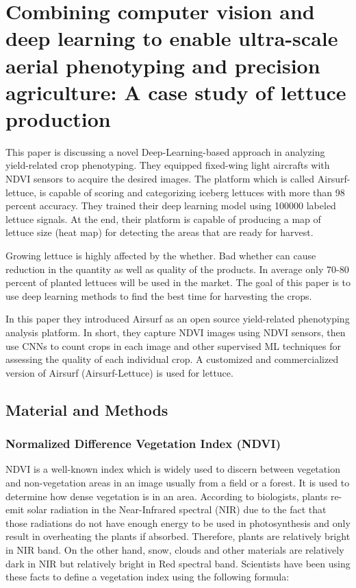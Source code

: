 \documentclass{article}
\begin{document}
\section{Combining computer vision and deep learning to enable ultra-scale aerial phenotyping and precision agriculture: A case study of lettuce production ~\cite{bauer-2019-combining-yield}}

This paper is discussing a novel Deep-Learning-based approach in analyzing yield-related crop phenotyping. They equipped fixed-wing light aircrafts with NDVI sensors to acquire the desired images. The platform which is called Airsurf-lettuce, is capable of scoring and categorizing iceberg lettuces with more than 98 percent accuracy. They trained their deep learning model using 100000 labeled lettuce signals. At the end, their platform is capable of producing a map of lettuce size (heat map) for detecting the areas that are ready for harvest. 

Growing lettuce is highly affected by the whether. Bad whether can cause reduction in the quantity as well as quality of the products. In average only 70-80 percent of planted lettuces will be used in the market. The goal of this paper is to use deep learning methods to find the best time for harvesting the crops.

In this paper they introduced Airsurf as an open source yield-related phenotyping analysis platform. In short, they capture NDVI images using NDVI sensors, then use CNNs to count crops in each image and other supervised ML techniques for assessing the quality of each individual crop. A customized and commercialized version of Airsurf (Airsurf-Lettuce) is used for lettuce. 

\subsection{Material and Methods}

\subsubsection{Normalized Difference Vegetation Index (NDVI)}
NDVI is a well-known index which is widely used to discern between vegetation and non-vegetation areas in an image usually from a field or a forest. It is used to determine how dense vegetation is in an area. According to biologists, plants re-emit solar radiation in the Near-Infrared spectral (NIR) due to the fact that those radiations do not have enough energy to be used in photosynthesis and only result in overheating the plants if absorbed. Therefore, plants are relatively bright in NIR band. On the other hand, snow, clouds and other materials are relatively dark in NIR but relatively bright in Red spectral band. Scientists have been using these facts to define a vegetation index using the following formula:
\end{document}
